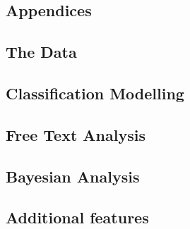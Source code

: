 \documentclass[11pt]{report}
\begin{document}
    \begin{appendices}
        \chapter{Appendices}

        \section{The Data}\label{sec:app-the-data}
        

        \section{Classification Modelling}\label{sec:app-classification-modelling}
        

        \section{Free Text Analysis}\label{sec:app-free-text-analysis}
        

        \section{Bayesian Analysis}
        
        
        \section{Additional features}\label{sec:app-additional-features}
        

    \end{appendices}
    
    
\end{document}
